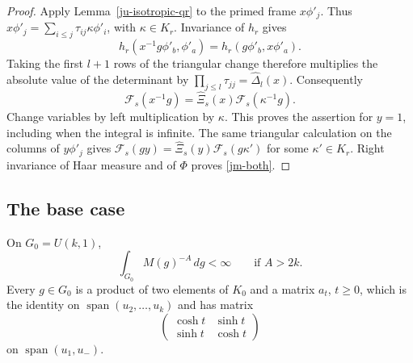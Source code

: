 \begin{proof}
Apply Lemma~\ref{ju-isotropic-qr} to the primed frame
\(x\phi'_j\).  Thus
\(x\phi'_j=\sum_{i\leq j}\tau_{ij}\kappa\phi'_i\),
with \(\kappa\in K_r\).
Invariance of \(h_r\) gives
\[
 h_r(x^{-1}g\phi'_b,\phi'_a)
                         =h_r(g\phi'_b,x\phi'_a).
\]
Taking the first \(l+1\) rows of the triangular change
therefore multiplies the absolute value of the determinant
by \(\prod_{j\leq l}\tau_{jj}=\widehat\Delta_l(x)\).
Consequently
\[
 \mathcal F_s(x^{-1}g)
          =\widehat\Xi_s(x)\mathcal F_s(\kappa^{-1}g).
\]
Change variables by left multiplication by \(\kappa\).
This proves the assertion for \(y=1\), including when the
integral is infinite.
The same triangular calculation on the columns of \(y\phi'_j\)
gives \(\mathcal F_s(gy)=\widehat\Xi_s(y)\mathcal F_s(g\kappa')\)
for some \(\kappa'\in K_r\).
Right invariance of Haar measure and of \(\Phi\) proves
\eqref{jm-both}.
\end{proof}

\subsection{The base case}

\begin{lemma}\label{jm-ball}
On \(G_0=U(k,1)\),
\[
                       \int_{G_0}M(g)^{-A}\,dg<\infty
                              \qquad\text{if }A>2k.
\]
Every \(g\in G_0\) is a product of two elements of \(K_0\)
and a matrix \(a_t\), \(t\geq0\), which is the identity on
\(\operatorname{span}(u_2,\ldots,u_k)\) and has matrix
\[
 \begin{pmatrix}\cosh t&\sinh t\\
                 \sinh t&\cosh t\end{pmatrix}
\]
on \(\operatorname{span}(u_1,u_-)\).
\end{lemma}

